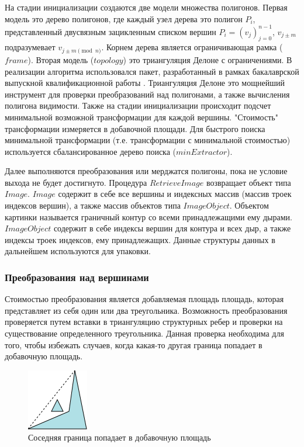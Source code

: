 \documentclass{fefu_thesis/cls/fefu}
\begin{document}
    На стадии инициализации создаются две модели множества полигонов. Первая модель это дерево полигонов, где каждый узел дерева это полигон $P_i$, представленный двусвязным зацикленным списком вершин $P_i = \left(v_j\right)_{j=0}^{n - 1}$, $v_{j \pm m}$ подразумевает $v_{j \pm m \pmod n}$. Корнем дерева является ограничивающая рамка ($frame$). Вторая модель ($topology$) это триангуляция Делоне с ограничениями. В реализации алгоритма использовался пакет, разработанный в рамках бакалаврской выпускной квалификационной работы \cite{Delaunay}. Триангуляция Делоне это мощнейший инструмент для проверки преобразований над полигонами, а также вычисления полигона видимости. Также на стадии инициализации происходит подсчет минимальной возможной трансформации для каждой вершины. "Стоимость" трансформации измеряется в добавочной площади. Для быстрого поиска минимальной трансформации (т.е. трансформации с минимальной стоимостью) используется сбалансированное дерево поиска ($minExtractor$).

    Далее выполняются преобразования или мерджатся полигоны, пока не условие выхода не будет достигнуто. Процедура $RetrieveImage$ возвращает объект типа $Image$. $Image$ содержит в себе все вершины и индексных массив (массив троек индексов вершин), а также массив объектов типа $ImageObject$. Объектом картинки называется граничный контур со всеми принадлежащими ему дырами. $ImageObject$ содержит в себе индексы вершин для контура и всех дыр, а также индексы троек индексов, ему принадлежащих. Данные структуры данных в дальнейшем используются для упаковки.

    \subsubsection{Преобразования над вершинами}
    Стоимостью преобразования является добавляемая площадь площадь, которая представляет из себя один или два треугольника. Возможность преобразования проверяется путем вставки в триангуляцию структурных ребер и проверки на существование определенного треугольника. Данная проверка необходима для того, чтобы избежать случаев, когда какая-то другая граница попадает в добавочную площадь.

    \begin{figure}[H]
        \centering
        \includegraphics[scale=1]{images/triangle_existance_check.png}
        \caption{Соседняя граница попадает в добавочную площадь}
    \end{figure}
\end{document}
